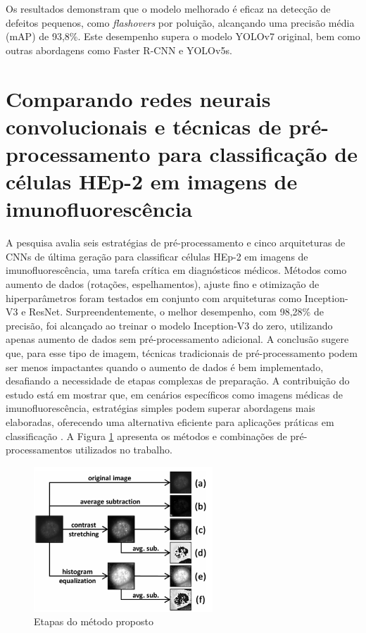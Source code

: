 Os resultados demonstram que o modelo melhorado é eficaz na detecção de defeitos pequenos, como \textit{flashovers} por poluição, alcançando uma precisão média (mAP) de 93,8\%. Este desempenho supera o modelo YOLOv7 original, bem como outras abordagens como Faster R-CNN e YOLOv5s.

\section{Comparando redes neurais convolucionais e técnicas de pré- processamento para classificação de células HEp-2 em imagens de imunofluorescência}
A pesquisa avalia seis estratégias de pré-processamento e cinco arquiteturas de CNNs de última geração para classificar células HEp-2 em imagens de imunofluorescência, uma tarefa crítica em diagnósticos médicos. Métodos como aumento de dados (rotações, espelhamentos), ajuste fino e otimização de hiperparâmetros foram testados em conjunto com arquiteturas como Inception-V3 e ResNet. Surpreendentemente, o melhor desempenho, com 98,28\% de precisão, foi alcançado ao treinar o modelo Inception-V3 do zero, utilizando apenas aumento de dados sem pré-processamento adicional. A conclusão sugere que, para esse tipo de imagem, técnicas tradicionais de pré-processamento podem ser menos impactantes quando o aumento de dados é bem implementado, desafiando a necessidade de etapas complexas de preparação. A contribuição do estudo está em mostrar que, em cenários específicos como imagens médicas de imunofluorescência, estratégias simples podem superar abordagens mais elaboradas, oferecendo uma alternativa eficiente para aplicações práticas em classificação \cite{rodrigues2020comparing}.
A Figura \ref{fig:preprocessing_rodrigues2020comparing} apresenta os métodos e combinações de pré-processamentos utilizados no trabalho.

\begin{figure}[H]
    \centering
    \caption{\label{fig:preprocessing_rodrigues2020comparing}Etapas do método proposto}
    \includegraphics[width=0.6\textwidth]{img/trabalhos_relacionados/preprocessing_rodrigues2020comparing.png}
\end{figure}

